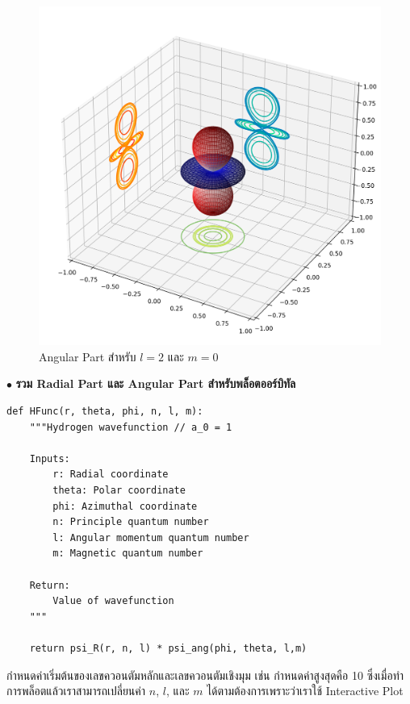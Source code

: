 \begin{figure}[H]
    \centering
    \includegraphics[width=0.9\linewidth]{fig/wfn_hydro_angular.png}
    \caption{Angular Part สำหรับ $l = 2$ และ $m = 0$}
    \label{fig:wfn_hydro_angular}
\end{figure}

\bigskip

$\bullet$ \textbf{รวม Radial Part และ Angular Part สำหรับพล็อตออร์บิทัล}

\begin{lstlisting}[style=MyPython]
def HFunc(r, theta, phi, n, l, m):
    """Hydrogen wavefunction // a_0 = 1

    Inputs:
        r: Radial coordinate
        theta: Polar coordinate
        phi: Azimuthal coordinate
        n: Principle quantum number
        l: Angular momentum quantum number
        m: Magnetic quantum number

    Return:
        Value of wavefunction
    """

    return psi_R(r, n, l) * psi_ang(phi, theta, l,m)
\end{lstlisting}

\noindent กำหนดค่าเริ่มต้นของเลขควอนตัมหลักและเลขควอนตัมเชิงมุม เช่น กำหนดค่าสูงสุดคือ 10 ซึ่งเมื่อทำการพล็อตแล้วเราสามารถเปลี่ยนค่า
$n$, $l$, และ $m$ ได้ตามต้องการเพราะว่าเราใช้ Interactive Plot

